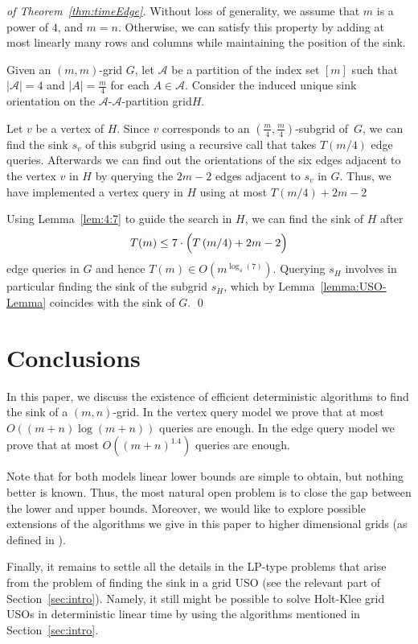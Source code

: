 \documentclass[runningheads,a4paper]{llncs}
\newcommand{\A}{\ensuremath{\mathcal A}}
\newcommand{\aapart}{$\A$-$\A$-partition grid\xspace}
\begin{document}
\begin{proof}[of Theorem~\ref{thm:timeEdge}]
    Without loss of generality, we assume that $m$ is a power of $4$, and
    $m=n$. Otherwise, we can satisfy this property by adding at most linearly many rows and columns while maintaining the position of the sink.

    Given an $(m,m)$-grid $G$, let $\A$
    be a partition of the index set $[m]$ such that
    $|\A| = 4$ and $|A| = \frac{m}{4}$ for each $A \in \A$.
    Consider the induced unique sink orientation on the \aapart $H$.
    
    
    Let $v$ be a vertex of $H$. Since $v$ corresponds to an $(\frac{m}{4},\frac{m}{4})$-subgrid of~$G$, we can find the sink $s_v$ of this subgrid using a recursive call that takes $T(m/4)$ edge queries.
    Afterwards we can find out the orientations of the six edges
    adjacent to the vertex $v$ in $H$ by querying the $2m-2$ edges adjacent to $s_v$ in $G$.
    Thus, we have implemented a vertex query in $H$ using at most $T(m/4) + 2m - 2$

Using Lemma~\ref{lem:4:7} to guide the search in $H$, we can find the sink of $H$ after
    \[
        T(m) \le 7 \cdot \Bigl( T \left( m/4 \right) + 2m-2 \Bigr)
    \]
    edge queries in $G$ and hence $T(m) \in O(m ^ {\log_4(7)})$. 
    Querying $s_H$ involves in particular finding the sink of the subgrid
        $s_H$, which by Lemma~\ref{lemma:USO-Lemma} coincides with the sink of
        $G$.
    \qed
\end{proof}

\section{Conclusions}
In this paper, we discuss the existence of efficient deterministic algorithms to find the sink of a $(m,n)$-grid. In the vertex query model 
we prove that at most $O((m+n)\log(m+n))$ queries are enough. In the edge query model we prove that at most $O((m+n)^{1.4})$ queries are enough.

Note that for both models linear lower bounds are simple to obtain, but nothing better is known. Thus, the most natural open problem
is to close the gap between the lower and upper bounds. Moreover, we would like to explore possible extensions of the algorithms we give 
in this paper to higher dimensional grids (as defined in \cite{grid08}).

Finally, it remains to settle all the details in the LP-type problems that arise from the problem of finding the 
sink in a grid USO (see the relevant part of Section~\ref{sec:intro}). Namely, it still might be possible 
to solve Holt-Klee grid USOs in deterministic linear time by using the algorithms mentioned in Section~\ref{sec:intro}.
\end{document}
